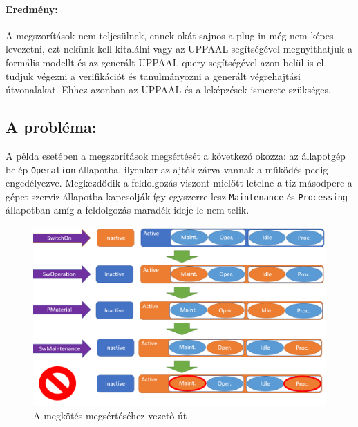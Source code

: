 \paragraph{Eredmény:} A megszorítások nem teljesülnek, ennek okát sajnos a plug-in még nem képes levezetni, ezt nekünk kell kitalálni vagy az UPPAAL segítségével megnyithatjuk a formális modellt és az generált UPPAAL query segítségével azon belül is el tudjuk végezni a verifikációt és tanulmányozni a generált végrehajtási útvonalakat. Ehhez azonban az UPPAAL és a leképzések ismerete szükséges.
\subsection{A probléma:} A példa esetében a megszorítások megsértését a következő okozza: az állapotgép belép \verb+Operation+ állapotba, ilyenkor az ajtók zárva vannak a működés pedig engedélyezve. Megkezdődik a feldolgozás viszont mielőtt letelne a tíz másodperc a gépet szerviz állapotba kapcsolják így egyszerre lesz \verb+Maintenance+ és \verb+Processing+ állapotban amíg a feldolgozás maradék ideje le nem telik.

\begin{figure}[H]
	\includegraphics[keepaspectratio, width=150mm]{figures/trace.png}
	\caption{A megkötés megsértéséhez vezető út}
\end{figure}

